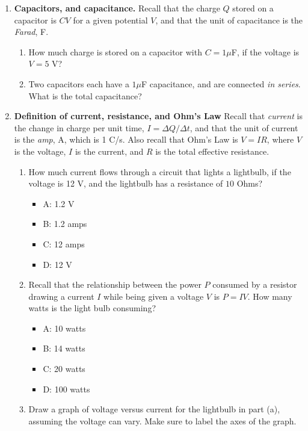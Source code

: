 \documentclass[10pt]{article}
\begin{document}
\begin{enumerate}
\begin{enumerate}
\end{enumerate}
\item \textbf{Capacitors, and capacitance.} Recall that the charge $Q$ stored on a capacitor is $CV$ for a given potential $V$, and that the unit of capacitance is the \textit{Farad}, F.
\begin{enumerate}
\item How much charge is stored on a capacitor with $C = 1\mu$F, if the voltage is $V = 5$ V? \\ \vspace{0.75cm}
\item Two capacitors each have a $1\mu$F capacitance, and are connected \textit{in series}.  What is the total capacitance?  \\ \vspace{0.75cm}
\end{enumerate}
\item \textbf{Definition of current, resistance, and Ohm's Law} Recall that \textit{current} is the change in charge per unit time, $I = \Delta Q/\Delta t$, and that the unit of current is the \textit{amp}, A, which is 1 C/s.  Also recall that Ohm's Law is $V=IR$, where $V$ is the voltage, $I$ is the current, and $R$ is the total effective resistance.
\begin{enumerate}
\item How much current flows through a circuit that lights a lightbulb, if the voltage is 12 V, and the lightbulb has a resistance of $10$ Ohms?
\begin{itemize}
\item A: 1.2 V
\item B: 1.2 amps
\item C: 12 amps
\item D: 12 V
\end{itemize}
\item Recall that the relationship between the power $P$ consumed by a resistor drawing a current $I$ while being given a voltage $V$ is $P=IV$.  How many watts is the light bulb consuming?
\begin{itemize}
\item A: 10 watts
\item B: 14 watts
\item C: 20 watts
\item D: 100 watts
\end{itemize}
\vspace{1cm}
\item Draw a graph of voltage versus current for the lightbulb in part (a), assuming the voltage can vary.  Make sure to label the axes of the graph. \\ \vspace{3cm}

\end{enumerate}
\end{enumerate}
\end{document}
